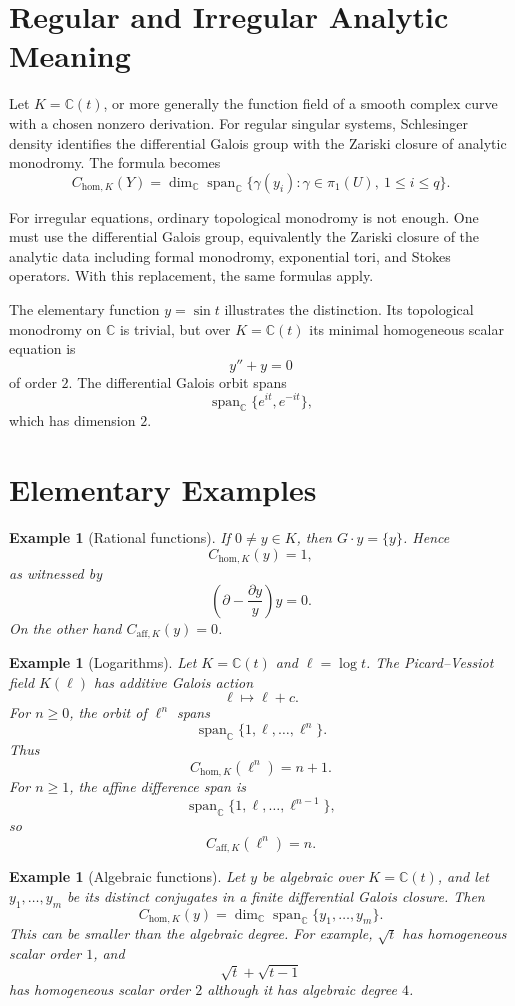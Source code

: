 \documentclass[11pt]{article}
\newtheorem{example}[theorem]{Example}
\DeclareMathOperator{\Span}{span}
\begin{document}
\section{Regular and Irregular Analytic Meaning}

Let \(K=\mathbb C(t)\), or more generally the function field of a smooth complex curve with a chosen nonzero derivation. For regular singular systems, Schlesinger density identifies the differential Galois group with the Zariski closure of analytic monodromy. The formula becomes
\[
C_{\mathrm{hom},K}(Y)
=
\dim_\mathbb C
\Span_\mathbb C\{\gamma(y_i):\gamma\in\pi_1(U),\ 1\le i\le q\}.
\]

For irregular equations, ordinary topological monodromy is not enough. One must use the differential Galois group, equivalently the Zariski closure of the analytic data including formal monodromy, exponential tori, and Stokes operators. With this replacement, the same formulas apply.

The elementary function \(y=\sin t\) illustrates the distinction. Its topological monodromy on \(\mathbb C\) is trivial, but over \(K=\mathbb C(t)\) its minimal homogeneous scalar equation is
\[
y''+y=0
\]
of order \(2\). The differential Galois orbit spans
\[
\Span_\mathbb C\{e^{it},e^{-it}\},
\]
which has dimension \(2\).

\section{Elementary Examples}

\begin{example}[Rational functions]
If \(0\ne y\in K\), then \(G\cdot y=\{y\}\). Hence
\[
C_{\mathrm{hom},K}(y)=1,
\]
as witnessed by
\[
\left(\partial-\frac{\partial y}{y}\right)y=0.
\]
On the other hand \(C_{\mathrm{aff},K}(y)=0\).
\end{example}

\begin{example}[Logarithms]
Let \(K=\mathbb C(t)\) and \(\ell=\log t\). The Picard--Vessiot field \(K(\ell)\) has additive Galois action
\[
\ell\mapsto \ell+c.
\]
For \(n\ge0\), the orbit of \(\ell^n\) spans
\[
\Span_\mathbb C\{1,\ell,\ldots,\ell^n\}.
\]
Thus
\[
C_{\mathrm{hom},K}(\ell^n)=n+1.
\]
For \(n\ge1\), the affine difference span is
\[
\Span_\mathbb C\{1,\ell,\ldots,\ell^{n-1}\},
\]
so
\[
C_{\mathrm{aff},K}(\ell^n)=n.
\]
\end{example}

\begin{example}[Algebraic functions]
Let \(y\) be algebraic over \(K=\mathbb C(t)\), and let \(y_1,\ldots,y_m\) be its distinct conjugates in a finite differential Galois closure. Then
\[
C_{\mathrm{hom},K}(y)
=
\dim_\mathbb C\Span_\mathbb C\{y_1,\ldots,y_m\}.
\]
This can be smaller than the algebraic degree. For example, \(\sqrt t\) has homogeneous scalar order \(1\), and
\[
\sqrt t+\sqrt{t-1}
\]
has homogeneous scalar order \(2\) although it has algebraic degree \(4\).
\end{example}
\end{document}
